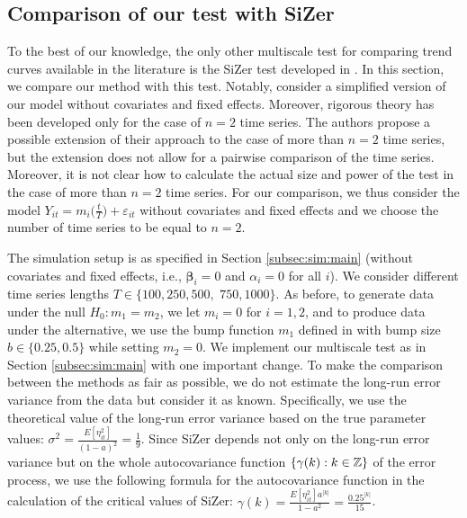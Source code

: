 \documentclass[12pt]{article}
\makeatletter
\renewcommand{\eqref}[1]{\tagform@{\ref{#1}}}
\makeatother
\begin{document}
\subsection{Comparison of our test with SiZer} 


To the best of our knowledge, the only other multiscale test for comparing trend curves available in the literature is the SiZer test developed in \cite{Park2009}. In this section, we compare our method with this test. Notably, \cite{Park2009} consider a simplified version of our model without covariates and fixed effects. Moreover, rigorous theory has been developed only for the case of $n=2$ time series. The authors propose a possible extension of their approach to the case of more than $n=2$ time series, but the extension does not allow for a pairwise comparison of the time series. Moreover, it is not clear how to calculate the actual size and power of the test in the case of more than $n=2$ time series. For our comparison, we thus consider the model $Y_{it} = m_i\big(\frac{t}{T}\big) + \varepsilon_{it}$ without covariates and fixed effects and we choose the number of time series to be equal to $n=2$. 


The simulation setup is as specified in Section \ref{subsec:sim:main} (without covariates and fixed effects, i.e., $\boldsymbol{\beta}_i = 0$ and $\alpha_i = 0$ for all $i$). We consider different time series lengths $T \in \{100,250,500,$ $750,1000\}$. As before, to generate data under the null $H_0: m_1 = m_2$, we let $m_i = 0$ for $i=1, 2$, and to produce data under the alternative, we use the bump function $m_1$ defined in \eqref{eq:bump-fct} with bump size $b \in \{ 0.25, 0.5 \}$ while setting $m_2 = 0$.
We implement our multiscale test as in Section \ref{subsec:sim:main} with one important change. To make the comparison between the methods as fair as possible, we do not estimate the long-run error variance from the data but consider it as known. Specifically, we use the theoretical value of the long-run error variance based on the true parameter values: $\sigma^2 = \frac{E[\eta_{it}^2]}{(1 - a)^2} = \frac{1}{9}$. Since SiZer depends not only on the long-run error variance but on the whole autocovariance function $\{ \gamma(k): k \in \mathbb{Z}\}$ of the error process, we use the following formula for the autocovariance function in the calculation of the critical values of SiZer: $\gamma(k) = \frac{E[\eta_{it}^2] a^{|k|}}{1 - a^2} = \frac{0.25^{|k|}}{15}$. %
\end{document}
